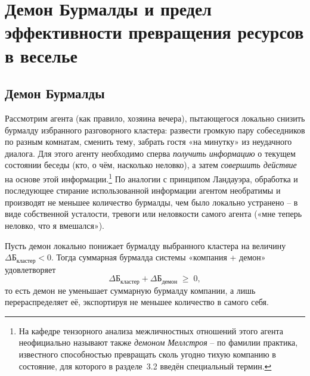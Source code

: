 \documentclass[11pt,a4paper]{article}
\newcommand{\Burm}{\text{Б}}
\begin{document}
\section{Демон Бурмалды и предел эффективности превращения ресурсов в веселье}

\subsection{Демон Бурмалды}

Рассмотрим агента (как правило, хозяина вечера), пытающегося локально снизить бурмалду избранного разговорного кластера: развести громкую пару собеседников по разным комнатам, сменить тему, забрать гостя «на минутку» из неудачного диалога. Для этого агенту необходимо сперва \emph{получить информацию} о текущем состоянии беседы (кто, о чём, насколько неловко), а затем \emph{совершить действие} на основе этой информации.\footnote{На кафедре тензорного анализа межличностных отношений этого агента неофициально называют также \emph{демоном Меллстроя} -- по фамилии практика, известного способностью превращать сколь угодно тихую компанию в состояние, для которого в разделе~3.2 введён специальный термин.} По аналогии с принципом Ландауэра, обработка и последующее стирание использованной информации агентом необратимы и производят не меньшее количество бурмалды, чем было локально устранено -- в виде собственной усталости, тревоги или неловкости самого агента («мне теперь неловко, что я вмешался»).

\begin{theorem}
Пусть демон локально понижает бурмалду выбранного кластера на величину $\Delta\Burm_{\text{кластер}}<0$. Тогда суммарная бурмалда системы «компания + демон» удовлетворяет
\[
\Delta\Burm_{\text{кластер}} + \Delta\Burm_{\text{демон}} \;\geq\; 0,
\]
то есть демон не уменьшает суммарную бурмалду компании, а лишь перераспределяет её, экспортируя не меньшее количество в самого себя.
\end{theorem}
\end{document}
